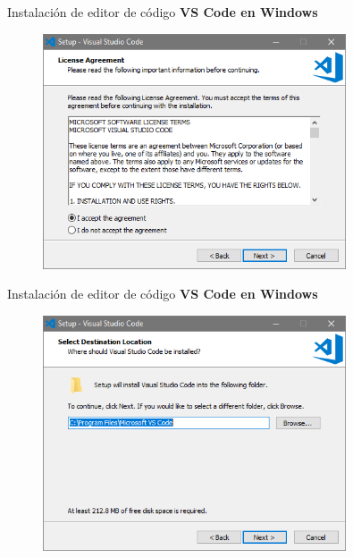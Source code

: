 \begin{frame}[fragile]{Instalación de editor de código}
  \textbf{VS Code en Windows}
   \begin{figure}
     \includegraphics[width=0.8\textwidth]{./resources/VSCODE_Step_02.PNG}
   \end{figure}
\end{frame}

\begin{frame}[fragile]{Instalación de editor de código}
  \textbf{VS Code en Windows}
   \begin{figure}
     \includegraphics[width=0.8\textwidth]{./resources/VSCODE_Step_03.PNG}
   \end{figure}
\end{frame}

